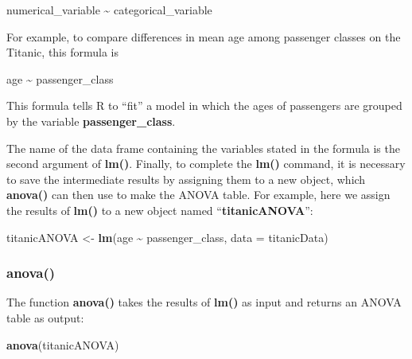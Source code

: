 \documentclass[
]{article}
\newenvironment{Shaded}{\begin{snugshade}}{\end{snugshade}}
\newcommand{\AttributeTok}[1]{\textcolor[rgb]{0.13,0.29,0.53}{#1}}
\newcommand{\FunctionTok}[1]{\textcolor[rgb]{0.13,0.29,0.53}{\textbf{#1}}}
\newcommand{\NormalTok}[1]{#1}
\newcommand{\OtherTok}[1]{\textcolor[rgb]{0.56,0.35,0.01}{#1}}
\newcommand{\SpecialCharTok}[1]{\textcolor[rgb]{0.81,0.36,0.00}{\textbf{#1}}}
\begin{document}
\begin{Shaded}
\begin{Highlighting}[]
\NormalTok{numerical\_variable }\SpecialCharTok{\textasciitilde{}}\NormalTok{ categorical\_variable}
\end{Highlighting}
\end{Shaded}

For example, to compare differences in mean age among passenger classes
on the Titanic, this formula is

\begin{Shaded}
\begin{Highlighting}[]
\NormalTok{age }\SpecialCharTok{\textasciitilde{}}\NormalTok{ passenger\_class}
\end{Highlighting}
\end{Shaded}

This formula tells R to ``fit'' a model in which the ages of passengers
are grouped by the variable \textbf{passenger\_class}.

The name of the data frame containing the variables stated in the
formula is the second argument of \textbf{lm()}. Finally, to complete
the \textbf{lm()} command, it is necessary to save the intermediate
results by assigning them to a new object, which \textbf{anova()} can
then use to make the ANOVA table. For example, here we assign the
results of \textbf{lm()} to a new object named
``\textbf{titanicANOVA}'':

\begin{Shaded}
\begin{Highlighting}[]
\NormalTok{titanicANOVA }\OtherTok{\textless{}{-}} \FunctionTok{lm}\NormalTok{(age }\SpecialCharTok{\textasciitilde{}}\NormalTok{ passenger\_class, }\AttributeTok{data =}\NormalTok{ titanicData)}
\end{Highlighting}
\end{Shaded}

\subsubsection{anova()}\label{anova-1}

The function \textbf{anova()} takes the results of \textbf{lm()} as
input and returns an ANOVA table as output:

\begin{Shaded}
\begin{Highlighting}[]
\FunctionTok{anova}\NormalTok{(titanicANOVA)}
\end{Highlighting}
\end{Shaded}
\end{document}
